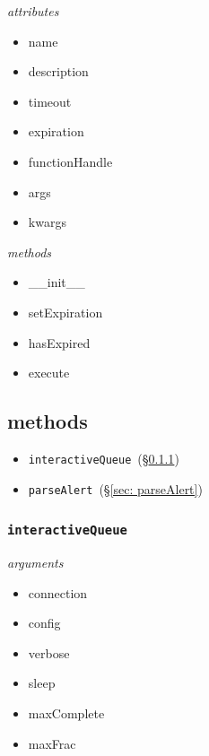 \documentclass{article}
\newcommand{\interactiveQueue}{\texttt{interactiveQueue}~}
\newcommand{\parseAlert}{\texttt{parseAlert}~}
\begin{document}
\noindent
\textit{attributes}

\begin{itemize}
    \item{name}
    \item{description}
    \item{timeout}
    \item{expiration}
    \item{functionHandle}
    \item{args}
    \item{kwargs}
\end{itemize}

\noindent
\textit{methods}

\begin{itemize}
    \item{\_\_init\_\_}
    \item{setExpiration}
    \item{hasExpired}
    \item{execute}
\end{itemize}


\subsection{methods}
\label{sec: methods}

\begin{itemize}
    \item{\interactiveQueue (\S\ref{sec: interactiveQueue})}
    \item{\parseAlert (\S\ref{sec: parseAlert})}
\end{itemize}


\subsubsection{\interactiveQueue}
\label{sec: interactiveQueue}

\noindent
\textit{arguments}

\begin{itemize}
    \item{connection}
    \item{config}
    \item{verbose}
    \item{sleep}
    \item{maxComplete}
    \item{maxFrac}
\end{itemize}
\end{document}
